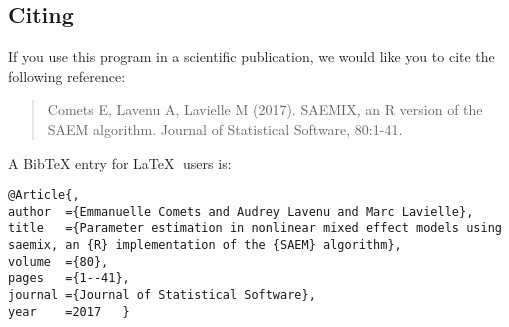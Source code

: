 \subsection{Citing \saemix}

\hskip 18pt If you use this program in a scientific publication, we would like
you to cite the following reference:
\begin{quotation}
\noindent 
Comets E, Lavenu A, Lavielle M (2017). SAEMIX, an R version of the SAEM algorithm. Journal of Statistical Software, 80:1-41.
\end{quotation}

A BibTeX entry for \LaTeX$\;$ users is:

\begin{verbatim}
@Article{,
author	={Emmanuelle Comets and Audrey Lavenu and Marc Lavielle},
title	={Parameter estimation in nonlinear mixed effect models using saemix, an {R} implementation of the {SAEM} algorithm},
volume	={80},
pages	={1--41},
journal	={Journal of Statistical Software},
year	=2017	}
\end{verbatim}

